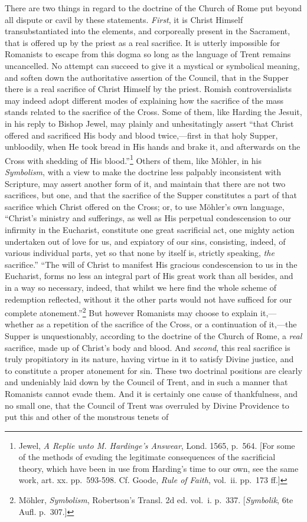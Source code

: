 \documentclass[english,]{book}
\begin{document}
There are two things in regard to the doctrine of the Church of Rome put beyond all dispute or cavil by these statements. \emph{First}, it is Christ Himself transubstantiated into the elements, and corporeally present in the Sacrament, that is offered up by the priest as a real sacrifice. It is utterly impossible for Romanists to escape from this dogma so long as the language of Trent remains uncancelled. No attempt can succeed to give it a mystical or symbolical meaning, and soften down the authoritative assertion of the Council, that in the Supper there is a real sacrifice of Christ Himself by the priest. Romish controversialists may indeed adopt different modes of explaining how the sacrifice of the mass stands related to the sacrifice of the Cross. Some of them, like Harding the Jesuit, in his reply to Bishop Jewel, may plainly and unhesitatingly assert ``that Christ offered and sacrificed His body and blood twice,---first in that holy Supper, unbloodily, when He took bread in His hands and brake it, and afterwards on the Cross with shedding of His blood.''\footnote{Jewel, \emph{A Replie unto M. Hardinge's Answear}, Lond. 1565, p.~564. {[}For some of the methods of evading the legitimate consequences of the sacrificial theory, which have been in use from Harding's time to our own, see the same work, art. xx. pp.~593-598. Cf. Goode, \emph{Rule of Faith}, vol.~ii. pp.~173 ff.{]}} Others of them, like Möhler, in his \emph{Symbolism}, with a view to make the doctrine less palpably inconsistent with Scripture, may assert another form of it, and maintain that there are not two sacrifices, but one, and that the sacrifice of the Supper constitutes a part of that sacrifice which Christ offered on the Cross; or, to use Möhler's own language, ``Christ's ministry and sufferings, as well as His perpetual condescension to our infirmity in the Eucharist, constitute one great sacrificial act, one mighty action undertaken out of love for us, and expiatory of our sins, consisting, indeed, of various individual parts, yet so that none by itself is, strictly speaking, \emph{the} sacrifice.'' ``The will of Christ to manifest His gracious condescension to us in the Eucharist, forms no less an integral part of His great work than all besides, and in a way so necessary, indeed, that whilst we here find the whole scheme of redemption reflected, without it the other parts would not have sufficed for our complete atonement.''\footnote{Möhler, \emph{Symbolism}, Robertson's Transl. 2d ed. vol.~i. p.~337. {[}\emph{Symbolik}, 6te Aufl. p.~307.{]}} But however Romanists may choose to explain it,---whether as a repetition of the sacrifice of the Cross, or a continuation of it,---the Supper is unquestionably, according to the doctrine of the Church of Rome, a \emph{real} sacrifice, made up of Christ's body and blood. And \emph{second}, this real sacrifice is truly propitiatory in its nature, having virtue in it to satisfy Divine justice, and to constitute a proper atonement for sin. These two doctrinal positions are clearly and undeniably laid down by the Council of Trent, and in such a manner that Romanists cannot evade them. And it is certainly one cause of thankfulness, and no small one, that the Council of Trent was overruled by Divine Providence to put this and other of the monstrous tenets of 
\end{document}
